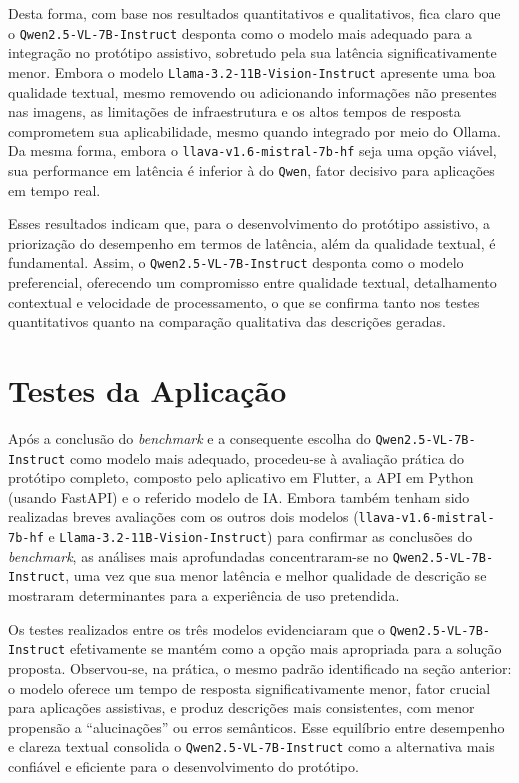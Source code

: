 Desta forma, com base nos resultados quantitativos e qualitativos, fica claro que o \lstinline{Qwen2.5-VL-7B-Instruct} desponta como o modelo mais adequado para a integração no protótipo assistivo, sobretudo pela sua latência significativamente menor. Embora o modelo \lstinline{Llama-3.2-11B-Vision-Instruct} apresente uma boa qualidade textual, mesmo removendo ou adicionando informações não presentes nas imagens, as limitações de infraestrutura e os altos tempos de resposta comprometem sua aplicabilidade, mesmo quando integrado por meio do Ollama. Da mesma forma, embora o \lstinline{llava-v1.6-mistral-7b-hf} seja uma opção viável, sua performance em latência é inferior à do \lstinline{Qwen}, fator decisivo para aplicações em tempo real.

Esses resultados indicam que, para o desenvolvimento do protótipo assistivo, a priorização do desempenho em termos de latência, além da qualidade textual, é fundamental. Assim, o \lstinline{Qwen2.5-VL-7B-Instruct} desponta como o modelo preferencial, oferecendo um compromisso entre qualidade textual, detalhamento contextual e velocidade de processamento, o que se confirma tanto nos testes quantitativos quanto na comparação qualitativa das descrições geradas.

\section{Testes da Aplicação}

Após a conclusão do \textit{benchmark} e a consequente escolha do \lstinline{Qwen2.5-VL-7B-Instruct} como modelo mais adequado, procedeu-se à avaliação prática do protótipo completo, composto pelo aplicativo em Flutter, a API em Python (usando FastAPI) e o referido modelo de IA. Embora também tenham sido realizadas breves avaliações com os outros dois modelos (\lstinline{llava-v1.6-mistral-7b-hf} e \lstinline{Llama-3.2-11B-Vision-Instruct}) para confirmar as conclusões do \textit{benchmark}, as análises mais aprofundadas concentraram-se no \lstinline{Qwen2.5-VL-7B-Instruct}, uma vez que sua menor latência e melhor qualidade de descrição se mostraram determinantes para a experiência de uso pretendida.

Os testes realizados entre os três modelos evidenciaram que o \lstinline{Qwen2.5-VL-7B-Instruct} efetivamente se mantém como a opção mais apropriada para a solução proposta. Observou-se, na prática, o mesmo padrão identificado na seção anterior: o modelo oferece um tempo de resposta significativamente menor, fator crucial para aplicações assistivas, e produz descrições mais consistentes, com menor propensão a “alucinações” ou erros semânticos. Esse equilíbrio entre desempenho e clareza textual consolida o \lstinline{Qwen2.5-VL-7B-Instruct} como a alternativa mais confiável e eficiente para o desenvolvimento do protótipo.

